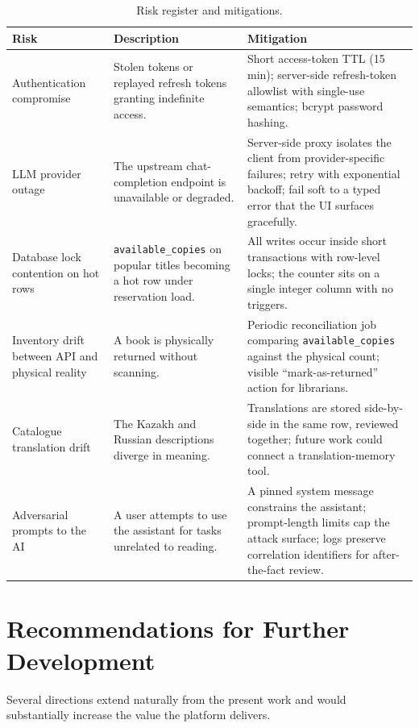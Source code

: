 \documentclass[12pt,a4paper]{report}
\begin{document}
\begin{table}[H]
\centering
\caption{Risk register and mitigations.}
\label{tab:risks}
\small
\begin{tabularx}{\textwidth}{l X X}
\toprule
\textbf{Risk} & \textbf{Description} & \textbf{Mitigation} \\
\midrule
Authentication compromise &
Stolen tokens or replayed refresh tokens granting indefinite access. &
Short access-token TTL (15 min); server-side refresh-token allowlist
with single-use semantics; bcrypt password hashing. \\
\addlinespace
LLM provider outage &
The upstream chat-completion endpoint is unavailable or degraded. &
Server-side proxy isolates the client from provider-specific
failures; retry with exponential backoff; fail soft to a typed error
that the UI surfaces gracefully. \\
\addlinespace
Database lock contention on hot rows &
\texttt{available\_copies} on popular titles becoming a hot row under
reservation load. &
All writes occur inside short transactions with row-level locks; the
counter sits on a single integer column with no triggers. \\
\addlinespace
Inventory drift between API and physical reality &
A book is physically returned without scanning. &
Periodic reconciliation job comparing
\texttt{available\_copies} against the physical count; visible
``mark-as-returned'' action for librarians. \\
\addlinespace
Catalogue translation drift &
The Kazakh and Russian descriptions diverge in meaning. &
Translations are stored side-by-side in the same row, reviewed
together; future work could connect a translation-memory tool. \\
\addlinespace
Adversarial prompts to the AI &
A user attempts to use the assistant for tasks unrelated to reading. &
A pinned system message constrains the assistant; prompt-length
limits cap the attack surface; logs preserve correlation
identifiers for after-the-fact review. \\
\bottomrule
\end{tabularx}
\end{table}

\section{Recommendations for Further Development}

Several directions extend naturally from the present work and would
substantially increase the value the platform delivers.
\end{document}
